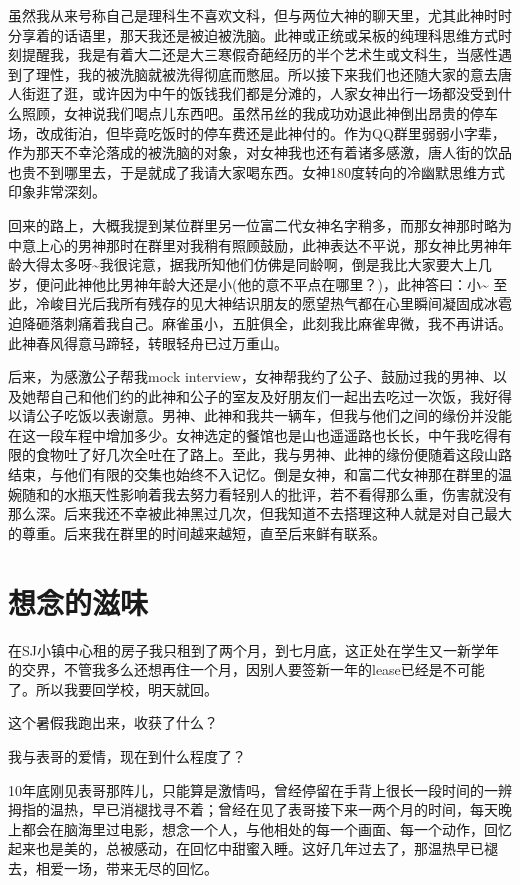 \documentclass[12pt]{book}
\begin{document}
虽然我从来号称自己是理科生不喜欢文科，但与两位大神的聊天里，尤其此神时时分享着的话语里，那天我还是被迫被洗脑。此神或正统或呆板的纯理科思维方式时刻提醒我，我是有着大二还是大三寒假奇葩经历的半个艺术生或文科生，当感性遇到了理性，我的被洗脑就被洗得彻底而憋屈。所以接下来我们也还随大家的意去唐人街逛了逛，或许因为中午的饭钱我们都是分滩的，人家女神出行一场都没受到什么照顾，女神说我们喝点儿东西吧。虽然吊丝的我成功劝退此神倒出昂贵的停车场，改成街泊，但毕竟吃饭时的停车费还是此神付的。作为QQ群里弱弱小字辈，作为那天不幸沦落成的被洗脑的对象，对女神我也还有着诸多感激，唐人街的饮品也贵不到哪里去，于是就成了我请大家喝东西。女神180度转向的冷幽默思维方式印象非常深刻。

回来的路上，大概我提到某位群里另一位富二代女神名字稍多，而那女神那时略为中意上心的男神那时在群里对我稍有照顾鼓励，此神表达不平说，那女神比男神年龄大得太多呀\textasciitilde{}我很诧意，据我所知他们仿佛是同龄啊，倒是我比大家要大上几岁，便问此神他比男神年龄大还是小(他的意不平点在哪里？)，此神答曰：小\textasciitilde{} 至此，冷峻目光后我所有残存的见大神结识朋友的愿望热气都在心里瞬间凝固成冰雹迫降砸落刺痛着我自己。麻雀虽小，五脏俱全，此刻我比麻雀卑微，我不再讲话。此神春风得意马蹄轻，转眼轻舟已过万重山。

后来，为感激公子帮我mock interview，女神帮我约了公子、鼓励过我的男神、以及她帮自己和他们约的此神和公子的室友及好朋友们一起出去吃过一次饭，我好得以请公子吃饭以表谢意。男神、此神和我共一辆车，但我与他们之间的缘份并没能在这一段车程中增加多少。女神选定的餐馆也是山也遥遥路也长长，中午我吃得有限的食物吐了好几次全吐在了路上。至此，我与男神、此神的缘份便随着这段山路结束，与他们有限的交集也始终不入记忆。倒是女神，和富二代女神那在群里的温婉随和的水瓶天性影响着我去努力看轻别人的批评，若不看得那么重，伤害就没有那么深。后来我还不幸被此神黑过几次，但我知道不去搭理这种人就是对自己最大的尊重。后来我在群里的时间越来越短，直至后来鲜有联系。

\chapter{想念的滋味}
\label{sec-4}

在SJ小镇中心租的房子我只租到了两个月，到七月底，这正处在学生又一新学年的交界，不管我多么还想再住一个月，因别人要签新一年的lease已经是不可能了。所以我要回学校，明天就回。

这个暑假我跑出来，收获了什么？

我与表哥的爱情，现在到什么程度了？

10年底刚见表哥那阵儿，只能算是激情吗，曾经停留在手背上很长一段时间的一辨拇指的温热，早已消褪找寻不着；曾经在见了表哥接下来一两个月的时间，每天晚上都会在脑海里过电影，想念一个人，与他相处的每一个画面、每一个动作，回忆起来也是美的，总被感动，在回忆中甜蜜入睡。这好几年过去了，那温热早已褪去，相爱一场，带来无尽的回忆。
\end{document}
